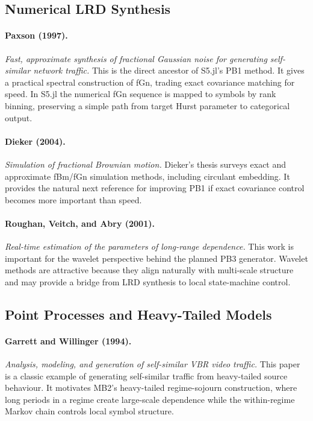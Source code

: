 \subsection{Numerical LRD Synthesis}

\paragraph{Paxson (1997).}
\emph{Fast, approximate synthesis of fractional Gaussian noise for generating
self-similar network traffic.}
This is the direct ancestor of S5.jl's PB1 method. It gives a practical spectral
construction of fGn, trading exact covariance matching for speed. In S5.jl the
numerical fGn sequence is mapped to symbols by rank binning, preserving a simple
path from target Hurst parameter to categorical output.

\paragraph{Dieker (2004).}
\emph{Simulation of fractional Brownian motion.}
Dieker's thesis surveys exact and approximate fBm/fGn simulation methods,
including circulant embedding. It provides the natural next reference for
improving PB1 if exact covariance control becomes more important than speed.

\paragraph{Roughan, Veitch, and Abry (2001).}
\emph{Real-time estimation of the parameters of long-range dependence.}
This work is important for the wavelet perspective behind the planned PB3
generator. Wavelet methods are attractive because they align naturally with
multi-scale structure and may provide a bridge from LRD synthesis to local
state-machine control.

\subsection{Point Processes and Heavy-Tailed Models}

\paragraph{Garrett and Willinger (1994).}
\emph{Analysis, modeling, and generation of self-similar VBR video traffic.}
This paper is a classic example of generating self-similar traffic from
heavy-tailed source behaviour. It motivates MB2's heavy-tailed regime-sojourn
construction, where long periods in a regime create large-scale dependence while
the within-regime Markov chain controls local symbol structure.

